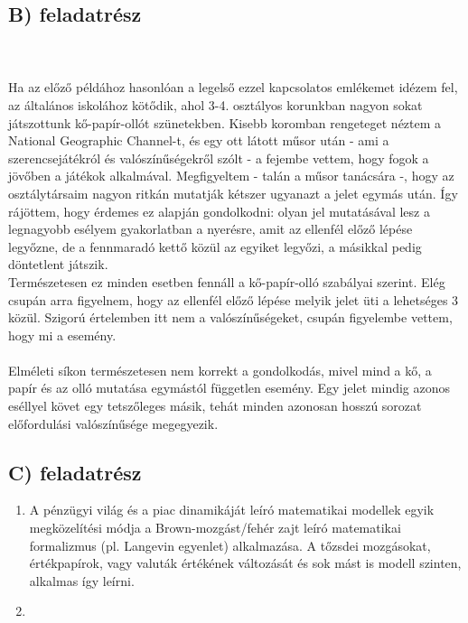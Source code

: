\subsection*{B) feladatrész}
\\ \\
Ha az előző példához hasonlóan a legelső ezzel kapcsolatos emlékemet idézem fel, az általános iskolához kötődik, ahol 3-4. osztályos korunkban nagyon sokat játszottunk kő-papír-ollót szünetekben. Kisebb koromban rengeteget néztem a National Geographic Channel-t, és egy ott látott műsor után - ami a szerencsejátékról és valószínűségekről szólt - a fejembe vettem, hogy  fogok a jövőben a játékok alkalmával. Megfigyeltem - talán a műsor tanácsára -, hogy az osztálytársaim nagyon ritkán mutatják kétszer ugyanazt a jelet egymás után. Így rájöttem, hogy érdemes ez alapján gondolkodni: olyan jel mutatásával lesz a legnagyobb esélyem gyakorlatban a nyerésre, amit az ellenfél előző lépése legyőzne, de a fennmaradó kettő közül az egyiket legyőzi, a másikkal pedig döntetlent játszik. \\
Természetesen ez minden esetben fennáll a kő-papír-olló szabályai szerint. Elég csupán arra figyelnem, hogy az ellenfél előző lépése melyik jelet üti a lehetséges 3 közül. Szigorú értelemben itt nem  a valószínűségeket, csupán figyelembe vettem, hogy mi a  esemény.
\\ \\
Elméleti síkon természetesen nem korrekt a gondolkodás, mivel mind a kő, a papír és az olló mutatása egymástól független esemény. Egy jelet mindig azonos eséllyel követ egy tetszőleges másik, tehát minden azonosan hosszú sorozat előfordulási valószínűsége megegyezik.

\subsection*{C) feladatrész}

\begin{enumerate}
    \item A pénzügyi világ és a piac dinamikáját leíró matematikai modellek egyik megközelítési módja a Brown-mozgást/fehér zajt leíró matematikai formalizmus (pl. Langevin egyenlet\cite{2013ChPhL..30h8901T}) alkalmazása. A tőzsdei mozgásokat, értékpapírok, vagy valuták értékének változását és sok mást is modell szinten, alkalmas így leírni.
    \item 
\end{enumerate}